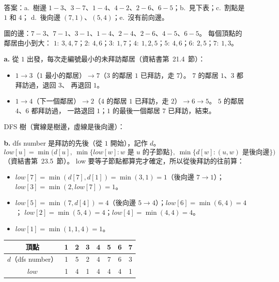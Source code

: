 \begin{pastsoln}
答案：a.\ 樹邊 $1\!-\!3$、$3\!-\!7$、$1\!-\!4$、$4\!-\!2$、$2\!-\!6$、$6\!-\!5$；b.\ 見下表；c.\ 割點是 $1$ 和 $4$；
d.\ 後向邊 $(7, 1)$、$(5, 4)$；e.\ 沒有前向邊。

圖的邊：$7\!-\!3$、$7\!-\!1$、$3\!-\!1$、$1\!-\!4$、$2\!-\!4$、$2\!-\!6$、$4\!-\!5$、$6\!-\!5$。 每個頂點的鄰居由小到大：
$1{:}\ 3, 4, 7$；$2{:}\ 4, 6$；$3{:}\ 1, 7$；$4{:}\ 1, 2, 5$；$5{:}\ 4, 6$；$6{:}\ 2, 5$；$7{:}\ 1, 3$。

\textbf{a.} 從 $1$ 出發，每次走編號最小的未拜訪鄰居（資結書第~21.4~節）：
\begin{itemize}
\item $1 \to 3$（$1$ 最小的鄰居）$\to 7$（$3$ 的鄰居 $1$ 已拜訪，走 $7$）。 $7$ 的鄰居 $1$、$3$ 都拜訪過，退回 $3$、
再退回 $1$。
\item $1 \to 4$（下一個鄰居）$\to 2$（$4$ 的鄰居 $1$ 已拜訪，走 $2$）$\to 6 \to 5$。 $5$ 的鄰居 $4$、$6$ 都拜訪過，
一路退回 $1$；$1$ 的最後一個鄰居 $7$ 已拜訪，結束。
\end{itemize}
DFS 樹（實線是樹邊，虛線是後向邊）：
\begin{center}
\end{center}

\textbf{b.} dfs number 是拜訪的先後（從 $1$ 開始），記作 $d$。
\[
\mathit{low}[u] = \min\bigl(d[u],\ \min\{\mathit{low}[w] : w \text{ 是 } u \text{ 的子節點}\},\
\min\{d[w] : (u, w) \text{ 是後向邊}\}\bigr)
\]
（資結書第~23.5~節）。 low 要等子節點都算完才確定，所以從後拜訪的往前算：
\begin{itemize}
\item $\mathit{low}[7] = \min(d[7], d[1]) = \min(3, 1) = 1$（後向邊 $7 \to 1$）；$\mathit{low}[3] = \min(2, \mathit{low}[7]) = 1$。
\item $\mathit{low}[5] = \min(7, d[4]) = 4$（後向邊 $5 \to 4$）；$\mathit{low}[6] = \min(6, 4) = 4$；
$\mathit{low}[2] = \min(5, 4) = 4$；$\mathit{low}[4] = \min(4, 4) = 4$。
\item $\mathit{low}[1] = \min(1, 1, 4) = 1$。
\end{itemize}
\begin{center}
\begin{tabular}{c*{7}{c}}
\toprule
頂點 & 1 & 2 & 3 & 4 & 5 & 6 & 7 \\
\midrule
$d$（dfs number） & 1 & 5 & 2 & 4 & 7 & 6 & 3 \\
$\mathit{low}$ & 1 & 4 & 1 & 4 & 4 & 4 & 1 \\
\bottomrule
\end{tabular}
\end{center}


\end{pastsoln}
